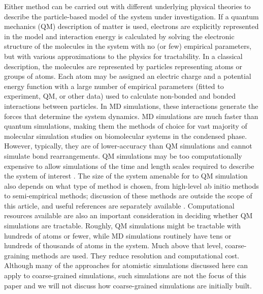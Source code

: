 \documentclass[9pt,bestpractices]{livecoms}
\begin{document}
Either method can be carried out with different underlying physical theories to describe the particle-based model of the system under investigation.
If a quantum mechanics (QM) description of matter is used, electrons are explicitly represented in the model and interaction energy is calculated by solving the electronic structure of the molecules in the system with no (or few) empirical parameters, but with various approximations to the physics for tractability. 
In a classical description, the molecules are represented by particles representing atoms or groups of atoms.  Each atom may be assigned an electric charge and a potential energy function with a large number of empirical parameters (fitted to experiment, QM, or other data) used to calculate non-bonded and bonded interactions between particles. 
In MD simulations, these interactions generate the forces that determine the system dynamics.
MD simulations are much faster than quantum simulations, making them the methods of choice for vast majority of molecular simulation studies on biomolecular systems in the condensed phase. 
However, typically, they are of lower-accuracy than QM simulations and cannot simulate bond rearrangements. 
QM simulations may be too computationally expensive to allow simulations of the time and length scales required to describe the system of interest \cite{Bottaro2018}. 
The size of the system amenable for to QM simulation also depends on what type of method is chosen, from high-level ab initio methods to semi-empirical methods; discussion of these methods are outside the scope of this article, and useful references are separately available \cite{Jensen2007}. 
Computational resources available are also an important consideration in deciding whether QM simulations are tractable. Roughly, QM simulations might be tractable with hundreds of atoms or fewer, while MD simulations routinely have tens or hundreds of thousands of atoms in the system. Much above that level, coarse-graining methods are used. 
They reduce resolution and computational cost. Although many of the approaches for atomistic simulations discussed here can apply to coarse-grained simulations, such simulations are not the focus of this paper and we will not discuss how coarse-grained simulations are initially built.
\end{document}
